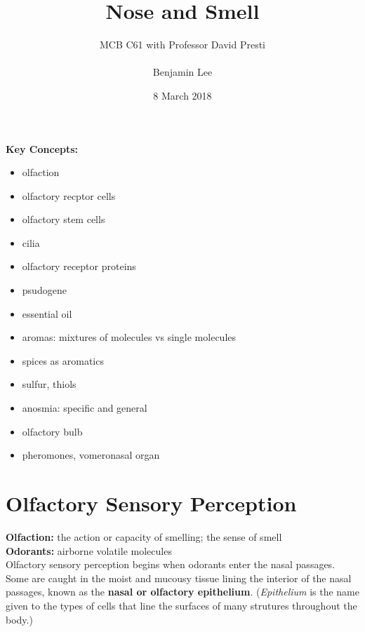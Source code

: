 \documentclass{article}
\title{Nose and Smell}
\author{MCB C61 with Professor David Presti \\ \\ Benjamin Lee}
\date{8 March 2018}
\begin{document}
\maketitle

\textbf{Key Concepts:}
\begin{itemize}
    \item olfaction
    \item olfactory recptor cells
    \item olfactory stem cells
    \item cilia
    \item olfactory receptor proteins
    \item psudogene
    \item essential oil
    \item aromas: mixtures of molecules vs single molecules
    \item spices as aromatics
    \item sulfur, thiols
    \item anosmia: specific and general
    \item olfactory bulb
    \item pheromones, vomeronasal organ
\end{itemize}

\newpage

\section{Olfactory Sensory Perception}

\textbf{Olfaction:} the action or capacity of smelling; the sense of smell \\
\textbf{Odorants:} airborne volatile molecules \\

Olfactory sensory perception begins when odorants enter the nasal passages. Some are caught in the moist and mucousy tissue lining the interior of the nasal passages, known as the \textbf{nasal or olfactory epithelium}. (\textit{Epithelium} is the name given to the types of cells that line the surfaces of many strutures throughout the body.)\\ 
\end{document}
